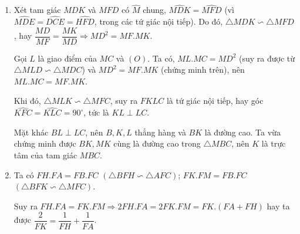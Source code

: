 \begin{bt}
{\begin{enumerate}
			Từ $(1),(2)$, kết hợp với $\widehat{MAD}+\widehat{DCO}=\widehat{FAC}+\widehat{ACF}=90^{\circ}$ ta được $\widehat{MDA}+\widehat{ODC}=90^{\circ}$, hay góc $\widehat{MDO}=90^{\circ}$, suy ra $MD\perp OD$.
			
			Chứng minh tương tự ta suy ra được $ME\perp OE,\widehat{MEO}=90^{\circ}$, cùng với $\widehat{MFO}=90^{\circ}$, ta suy ra  $ 5 $ điểm $M,D,O,F,E$ cùng thuộc đường tròn đường kính $OM$.
			\item 
			Xét tam giác $MDK$ và $MFD$ có $\widehat{M}$ chung, $\widehat{MDK}=\widehat{MFD}$ (vì $\widehat{MDE}=\widehat{DCE}=\widehat{HFD}$, trong các tứ giác nội tiếp). Do đó, $\triangle MDK\backsim \triangle MFD$, hay $\dfrac{MD}{MF}=\dfrac{MK}{MD}\Rightarrow MD^2=MF.MK$.
			
			Gọi $L$ là giao điểm của $MC$ và $(O)$. Ta có, $ML.MC=MD^2$ (suy ra được từ $\triangle MLD\backsim \triangle MDC$) và $MD^2=MF.MK$ (chứng minh trên), nên $ML.MC=MF.MK$.  
			
			Khi đó, $\triangle MLK\backsim \triangle MFC$, suy ra $FKLC$ là tứ giác nội tiếp, hay góc $\widehat{KFC}=\widehat{KLC}=90^{\circ}$, tức là $KL\perp LC$.
			
			Mặt khác $BL\perp LC$, nên $B,K,L$ thẳng hàng và $BK$ là đường cao. Ta vừa chứng minh được $BK, MK$ cùng là đường cao trong $\triangle MBC$, nên $K$ là trực tâm của tam giác $MBC$.
			\item 
			Ta có $FH.FA=FB.FC$ $(\triangle BFH\backsim\triangle AFC)$; $FK.FM=FB.FC$ $(\triangle BFK\backsim\triangle MFC)$.
			
			Suy ra $FH.FA=FK.FM\Rightarrow 2FH.FA=2FK.FM=FK.(FA+FH)$ hay ta được $\dfrac{2}{FK}=\dfrac{1}{FH}+\dfrac{1}{FA}$.
			
		\end{enumerate}
		
	}
\end{bt}

